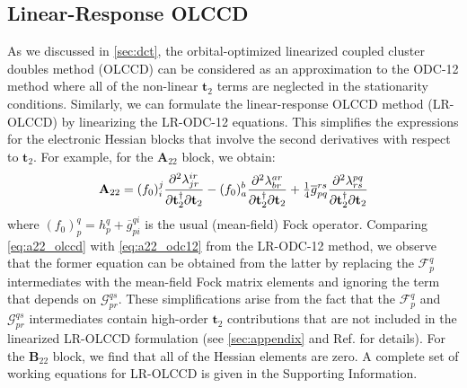 \subsection{Linear-Response OLCCD}
\label{sec:olccd}
As we discussed in \cref{sec:dct}, the orbital-optimized linearized coupled cluster doubles method (OLCCD) can be considered as an approximation to the ODC-12 method where all of the non-linear $\mathbf{t}_2$ terms are neglected in the stationarity conditions. Similarly, we can formulate the linear-response OLCCD method (LR-OLCCD) by linearizing the LR-ODC-12 equations. This simplifies the expressions for the electronic Hessian blocks that involve the second derivatives with respect to $\mathbf{t}_2$. For example, for the $\mathbf{A}_{22}$ block, we obtain:
\begin{equation}
    \label{eq:a22_olccd}
    \mathbf{A}_{22}
    =
    (f_0)_i^j
    \dfrac{\partial^2 \lambda^{ir}_{jr}}{%
        \partial\mathbf{t}_2^\dagger
        \partial\mathbf{t}_2
    }
    -
    (f_0)_a^b
    \dfrac{\partial^2 \lambda^{ar}_{br}}{%
        \partial\mathbf{t}_2^\dagger
        \partial\mathbf{t}_2
    }
    +
    \tfrac{1}{4}
    \overline{g}_{pq}^{rs}
    \dfrac{\partial^2 \lambda^{pq}_{rs}}{%
        \partial\mathbf{t}_2^\dagger
        \partial\mathbf{t}_2
    }
\end{equation}
where
\(
    (f_0)_p^q
    =
    h_p^q
    +
    \overline{g}_{pi}^{qi}
\)
is the usual (mean-field) Fock operator.
Comparing \cref{eq:a22_olccd} with \cref{eq:a22_odc12} from the LR-ODC-12
method, we observe that the former equation can be obtained from the latter by
replacing the $\mathcal{F}_p^q$ intermediates with the mean-field Fock matrix
elements and ignoring the term that depends on $\mathcal{G}_{pr}^{qs}$.
These simplifications arise from the fact that the $\mathcal{F}_p^q$ and
$\mathcal{G}_{pr}^{qs}$ intermediates contain high-order $\mathbf{t}_2$
contributions that are not included in the linearized LR-OLCCD formulation (see
\cref{sec:appendix} and Ref.\@ {} for details).
For the $\mathbf{B}_{22}$ block, we find that all of the Hessian elements are
zero.
A complete set of working equations for LR-OLCCD is given in the Supporting
Information.

